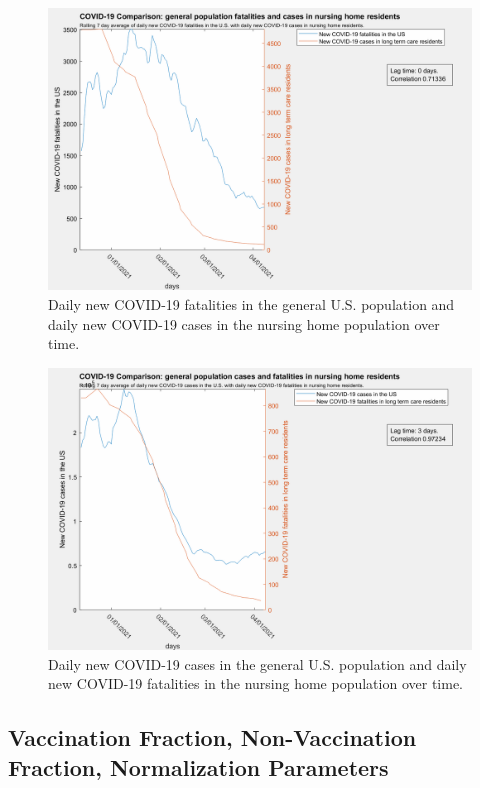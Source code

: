 \documentclass[twoside]{article}
\begin{document}
\begin{multicols}{2}
\begin{figure}[H]
	\includegraphics[width=\linewidth]{images/usaFatalities_nursingCases-0lag.png}
	\caption{Daily new COVID-19 fatalities in the general U.S. population and daily new COVID-19 cases in the nursing home population over time.}
	\label{fig:images/usaFatalities_nursingCases-0lagLabel}
\end{figure}

\begin{figure}[H]
	\includegraphics[width=\linewidth]{images/usaCases_nursingFatalities-3lag.png}
	\caption{Daily new COVID-19 cases in the general U.S. population and daily new COVID-19 fatalities in the nursing home population over time.}
	\label{fig:images/usaCases_nursingFatalities-3lagLabel}
\end{figure}

\subsection{Vaccination Fraction, Non-Vaccination Fraction, Normalization Parameters}


\end{multicols}
\end{document}
